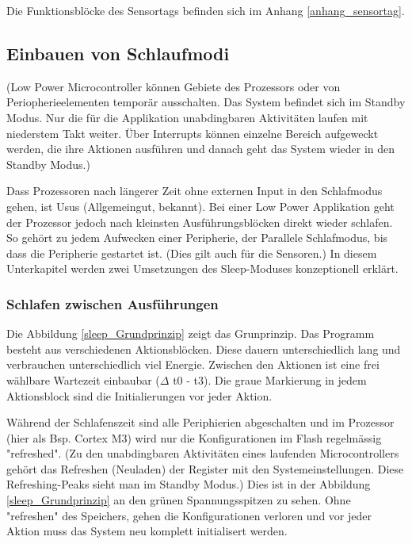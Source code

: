 Die Funktionsblöcke des Sensortags befinden sich im Anhang \ref{anhang_sensortag}.

\subsection{Einbauen von Schlaufmodi}\label{pm_sleep} 

(Low Power Microcontroller können Gebiete des Prozessors oder von Periopherieelementen temporär ausschalten. Das System befindet sich im Standby Modus. Nur die für die Applikation unabdingbaren Aktivitäten laufen mit niederstem Takt weiter. Über Interrupts können einzelne Bereich aufgeweckt werden, die ihre Aktionen ausführen und danach geht das System wieder in den Standby Modus.)


Dass Prozessoren nach längerer Zeit ohne externen Input in den Schlafmodus gehen, ist Usus (Allgemeingut, bekannt). Bei einer Low Power Applikation geht der Prozessor jedoch nach kleinsten Ausführungsblöcken direkt wieder schlafen. So gehört zu jedem Aufwecken einer Peripherie, der Parallele Schlafmodus, bis dass die Peripherie gestartet ist. (Dies gilt auch für die Sensoren.) In diesem Unterkapitel werden zwei Umsetzungen des Sleep-Moduses konzeptionell erklärt.

\subsubsection{Schlafen zwischen Ausführungen}

Die Abbildung \ref{sleep_Grundprinzip} zeigt das Grunprinzip. Das Programm besteht aus verschiedenen Aktionsblöcken. Diese dauern unterschiedlich lang und verbrauchen unterschiedlich viel Energie. Zwischen den Aktionen ist eine frei wählbare Wartezeit einbaubar ($\Delta$ t0 - t3). Die graue Markierung in jedem Aktionsblock sind die Initialierungen vor jeder Aktion.

Während der Schlafenszeit sind alle Periphierien abgeschalten und im Prozessor (hier als Bsp. Cortex M3) wird nur die Konfigurationen im Flash regelmässig "refreshed". (Zu den unabdingbaren Aktivitäten eines laufenden Microcontrollers gehört das Refreshen (Neuladen) der Register mit den Systemeinstellungen. Diese Refreshing-Peaks sieht man im Standby Modus.)  Dies ist in der Abbildung \ref{sleep_Grundprinzip} an den grünen Spannungsspitzen zu sehen. Ohne "refreshen" des Speichers, gehen die Konfigurationen verloren und vor jeder Aktion muss das System neu komplett initialisert werden.

